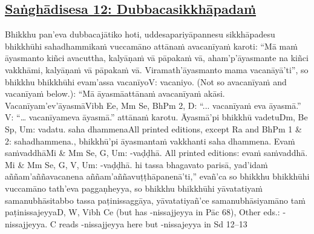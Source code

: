 \subsection*{\hyperref[comm12]{Saṅghādisesa 12: Dubbacasikkhāpadaṁ}}
\label{sd12}

Bhikkhu pan'eva dubbacajātiko hoti, uddesapariyāpannesu sikkhāpadesu bhikkhūhi sahadhammikaṁ vuccamāno attānaṁ avacanīyaṁ karoti: ``Mā maṁ āyasmanto kiñci avacuttha, kalyāṇaṁ vā pāpakaṁ vā, aham'p'āyasmante na kiñci vakkhāmi, kalyāṇaṁ vā pāpakaṁ vā. Viramath'āyasmanto mama vacanāyā'ti'', so bhikkhu bhikkhūhi evam'assa vacanīyo\makeatletter\hyperlink{endnote-appendix}\makeatother V: vacaniyo. (Not so avacanīyaṁ and vacanīyaṁ below.): ``Mā āyasmā\makeatletter\hyperlink{endnote-appendix}\makeatother  attānaṁ avacanīyaṁ akāsi. Vacanīyam'ev'āyasmā\makeatletter\hyperlink{endnote-appendix}\makeatother Vibh Ee, Mm Se, BhPm 2, D: “... vacanīyaṁ eva āyasmā.” V: “… vacanīyameva āyasmā.” attānaṁ karotu. Āyasmā'pi bhikkhū vadetu\makeatletter\hyperlink{endnote-appendix}\makeatother Dm, Be Sp, Um: vadatu. saha dhammena\makeatletter\hyperlink{endnote-appendix}\makeatother All printed editions, except Ra and BhPm 1 & 2: sahadhammena., bhikkhū'pi āyasmantaṁ vakkhanti saha dhammena. Evaṁ saṁvaddhā\makeatletter\hyperlink{endnote-appendix}\makeatother Mi & Mm Se, G, Um: -vaḍḍhā. All printed editions: evaṁ saṁvaddhā. Mi & Mm Se, G, V, Um: -vaḍḍhā. hi tassa bhagavato parisā, yad'idaṁ aññam'aññavacanena aññam'aññavuṭṭhāpanenā'ti,'' evañ'ca so bhikkhu bhikkhūhi vuccamāno tath'eva paggaṇheyya, so bhikkhu bhikkhūhi yāvatatiyaṁ samanubhāsitabbo tassa paṭinissaggāya, yāvatatiyañ'ce samanubhāsiyamāno taṁ paṭinissajeyya\makeatletter\hyperlink{endnote-appendix}\makeatother D, W, Vibh Ce (but has -nissajjeyya in Pāc 68), Other eds.: -nissajjeyya. C reads -nissajjeyya here but -nissajeyya in Sd 12–13
